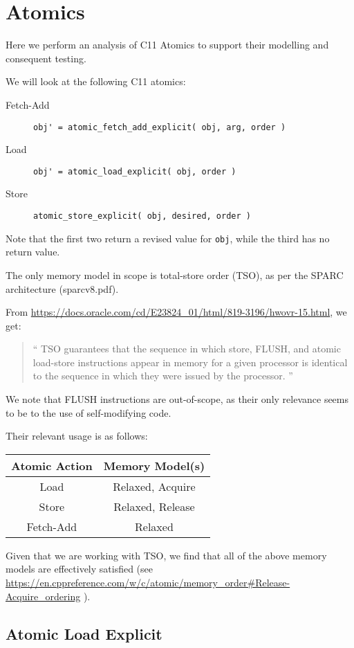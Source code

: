 \section{Atomics}\label{sec:atomics}

Here we perform an analysis of C11 Atomics to support their modelling
and consequent testing.

We will look at the following C11 atomics:
\begin{description}
  \item [Fetch-Add] \verb"obj' = atomic_fetch_add_explicit( obj, arg, order )"
  \item [Load] \verb"obj' = atomic_load_explicit( obj, order )"
  \item [Store] \verb"atomic_store_explicit( obj, desired, order )"
\end{description}
Note that the first two return a revised value for \verb"obj",
while the third has no return value.

The only memory model in scope is total-store order (TSO),
as per the SPARC architecture (sparcv8.pdf).

From \url{https://docs.oracle.com/cd/E23824_01/html/819-3196/hwovr-15.html},
we get:
\begin{quote}
``
TSO guarantees that the sequence in which store, FLUSH,
and atomic load-store instructions appear in memory for a given processor
is identical to the sequence in which they were issued by the processor.
''
\end{quote}
We note that FLUSH instructions are out-of-scope,
as their only relevance seems to be to the use of self-modifying code.

Their relevant usage is as follows:

\begin{tabular}{|c|c|}
  \hline
  Atomic Action & Memory Model(s)
\\\hline
  Load & Relaxed, Acquire
\\\hline
  Store & Relaxed, Release
\\\hline
  Fetch-Add & Relaxed
\\\hline
\end{tabular}

Given that we are working with TSO,
we find that all of the above memory models are effectively satisfied
(see
\url{https://en.cppreference.com/w/c/atomic/memory_order#Release-Acquire_ordering}
).

\subsection{Atomic Load Explicit}

